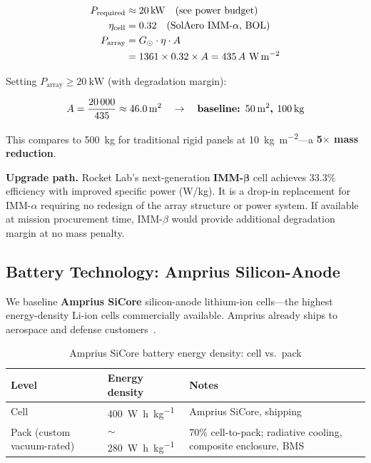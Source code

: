 \documentclass[10pt,letterpaper]{article}
\begin{document}
\begin{align}
  P_{\text{required}} &\approx \SI{20}{\kilo\watt} \quad \text{(see power budget)} \\
  \eta_{\text{cell}}  &= 0.32 \quad \text{(SolAero IMM-$\alpha$, BOL)} \\
  P_{\text{array}}    &= G_{\odot} \cdot \eta \cdot A \notag \\
    &= 1361 \times 0.32 \times A = 435\, A\ \si{\watt\per\meter\squared}
\end{align}

Setting $P_{\text{array}} \geq \SI{20}{\kilo\watt}$ (with degradation margin):

\[
  A = \frac{20\,000}{435} \approx \SI{46.0}{\meter\squared}
    \quad \rightarrow \quad \textbf{baseline: \SI{50}{\meter\squared},\ \SI{100}{\kilo\gram}}
\]

\noindent This compares to \SI{500}{\kilo\gram} for traditional rigid panels
at \SI{10}{\kilo\gram\per\meter\squared}---a \textbf{5$\times$ mass
reduction}.

\medskip
\noindent \textbf{Upgrade path.} Rocket Lab's next-generation
\textbf{IMM-$\boldsymbol\beta$} cell achieves 33.3\% efficiency with improved
specific power (W/kg). It is a drop-in replacement for IMM-$\alpha$ requiring
no redesign of the array structure or power system. If available at mission
procurement time, IMM-$\beta$ would provide additional degradation margin at no
mass penalty.

\subsection{Battery Technology: Amprius Silicon-Anode}

We baseline \textbf{Amprius SiCore} silicon-anode lithium-ion cells---the
highest energy-density Li-ion cells commercially available. Amprius already
ships to aerospace and defense customers~\cite{Amprius}.

\begin{table}[!ht]
\centering\small
\caption{Amprius SiCore battery energy density: cell vs.\ pack}
\label{tab:battery-energy}
\begin{tabularx}{\linewidth}{llX}
\toprule
\textbf{Level} & \textbf{Energy density} & \textbf{Notes} \\
\midrule
Cell & \SI{400}{\watt\hour\per\kilo\gram} & Amprius SiCore, shipping \\
Pack (custom vacuum-rated) & $\sim$\SI{280}{\watt\hour\per\kilo\gram} & 70\% cell-to-pack; radiative cooling, composite enclosure, BMS \\
\bottomrule
\end{tabularx}
\end{table}
\end{document}
